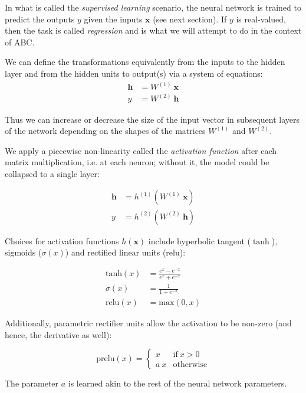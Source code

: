 \documentclass{article}
\begin{document}
In what is called the \textit{supervised learning} scenario, the neural network is trained to predict the outputs $y$ given the inputs $\mathbf{x}$ (see next section). If $y$ is real-valued, then the task is called \textit{regression} and is what we will attempt to do in the context of ABC.
\vskip 0.1in

We can define the transformations equivalently from the inputs to the hidden layer and from the hidden units to output(s) via a system of equations:
%
\begin{align}
    \mathbf{h} &= W^{(1)}\ \mathbf{x} \\
    y &= W^{(2)}\ \mathbf{h}
\end{align}

Thus we can increase or decrease the size of the input vector in subsequent layers of the network depending on the shapes of the  matrices $W^{(1)}$ and $W^{(2)}$.
\vskip 0.1in

We apply a piecewise non-linearity called the \textit{activation function} after each matrix multiplication, i.e. at each neuron; without it, the model could be collapsed to a single layer:

\begin{align}
    \mathbf{h} &= h^{(1)}(W^{(1)}\ \mathbf{x}) \\
    y &= h^{(2)} (W^{(2)}\ \mathbf{h})
\end{align}

Choices for activation functions $h(\mathbf{x})$ include hyperbolic tangent ($\tanh$), sigmoids ($\sigma(x)$) and rectified linear units (relu):

\begin{align}
    \text{tanh}(x) &= \frac{e^x - e^{-x}}{e^x + e^{-x}} \\
    \sigma(x) &= \frac{1}{1 + e^{-x}} \\
    \text{relu}(x) &= \text{max}(0, x)
\end{align}

Additionally, parametric rectifier units allow the activation to be non-zero (and hence, the derivative as well):

\begin{equation}
    \text{prelu}(x) = \begin{cases}
        x       & \text{if}\ x > 0 \\
        a\ x    & \text{otherwise}
    \end{cases}
\end{equation}

The parameter $a$ is learned akin to the rest of the neural network parameters.
\vskip 0.1in
\end{document}
